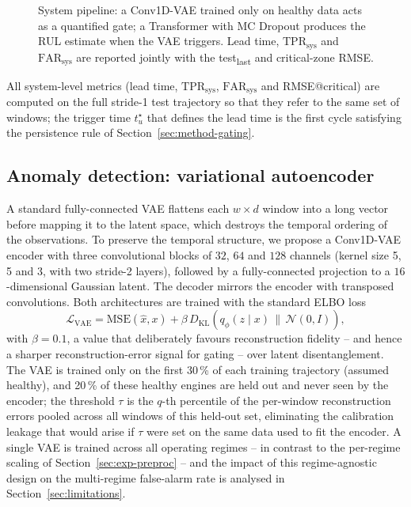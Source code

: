 \documentclass[5p,times,authoryear]{elsarticle}
\begin{document}
\begin{figure}[!t]
\caption{System pipeline: a Conv1D-VAE trained only on healthy data acts as a quantified gate; a Transformer with MC Dropout produces the RUL estimate when the VAE triggers. Lead time, $\mathrm{TPR}_{\mathrm{sys}}$ and $\mathrm{FAR}_{\mathrm{sys}}$ are reported jointly with the test\textsubscript{last} and critical-zone RMSE.}
\label{fig:pipeline}
\end{figure}

All system-level metrics (lead time, $\mathrm{TPR}_{\mathrm{sys}}$, $\mathrm{FAR}_{\mathrm{sys}}$ and RMSE@critical) are computed on the full stride-1 test trajectory so that they refer to the same set of windows; the trigger time $t^\star_u$ that defines the lead time is the first cycle satisfying the persistence rule of Section~\ref{sec:method-gating}.

\subsection{Anomaly detection: variational autoencoder}\label{sec:method-vae}

A standard fully-connected VAE flattens each $w\times d$ window into a long vector before mapping it to the latent space, which destroys the temporal ordering of the observations. To preserve the temporal structure, we propose a Conv1D-VAE encoder with three convolutional blocks of $32$, $64$ and $128$ channels (kernel size 5, 5 and 3, with two stride-2 layers), followed by a fully-connected projection to a $16$-dimensional Gaussian latent. The decoder mirrors the encoder with transposed convolutions. Both architectures are trained with the standard ELBO loss
\begin{equation}
\mathcal{L}_{\mathrm{VAE}} = \mathrm{MSE}(\hat x, x) + \beta\,D_{\mathrm{KL}}\!\left(q_\phi(z\mid x)\,\|\,\mathcal{N}(0,I)\right),
\label{eq:vae}
\end{equation}
with $\beta=0.1$, a value that deliberately favours reconstruction fidelity -- and hence a sharper reconstruction-error signal for gating -- over latent disentanglement. The VAE is trained only on the first 30\,\% of each training trajectory (assumed healthy), and 20\,\% of these healthy engines are held out and never seen by the encoder; the threshold $\tau$ is the $q$-th percentile of the per-window reconstruction errors pooled across all windows of this held-out set, eliminating the calibration leakage that would arise if $\tau$ were set on the same data used to fit the encoder. A single VAE is trained across all operating regimes -- in contrast to the per-regime scaling of Section~\ref{sec:exp-preproc} -- and the impact of this regime-agnostic design on the multi-regime false-alarm rate is analysed in Section~\ref{sec:limitations}.
\end{document}
